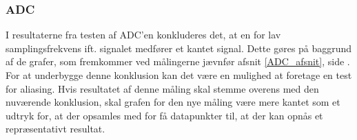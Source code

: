 \subsubsection{ADC}
I resultaterne fra testen af ADC'en konkluderes det, at en for lav samplingsfrekvens ift. signalet medfører et kantet signal. Dette gøres på baggrund af de grafer, som fremkommer ved målingerne jævnfør afsnit \ref{ADC_afsnit}, side \pageref{ADC_afsnit}. For at underbygge denne konklusion kan det være en mulighed at foretage en test for aliasing.%
Hvis resultatet af denne måling skal stemme overens med den nuværende konklusion, skal grafen for den nye måling være mere kantet som et udtryk for, at der opsamles med for få datapunkter til, at der kan opnås et repræsentativt resultat.


